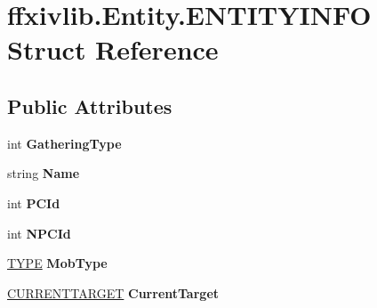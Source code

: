\hypertarget{structffxivlib_1_1_entity_1_1_e_n_t_i_t_y_i_n_f_o}{\section{ffxivlib.\-Entity.\-E\-N\-T\-I\-T\-Y\-I\-N\-F\-O Struct Reference}
\label{structffxivlib_1_1_entity_1_1_e_n_t_i_t_y_i_n_f_o}
}
\subsection*{Public Attributes}
\begin{DoxyCompactItemize}
\item 
\hypertarget{structffxivlib_1_1_entity_1_1_e_n_t_i_t_y_i_n_f_o_a179e48b58b038509c996fd001b630450}{int {\bfseries Gathering\-Type}}\label{structffxivlib_1_1_entity_1_1_e_n_t_i_t_y_i_n_f_o_a179e48b58b038509c996fd001b630450}

\item 
\hypertarget{structffxivlib_1_1_entity_1_1_e_n_t_i_t_y_i_n_f_o_a6e5d16391e1a4c5315d62bedb8adc6ee}{string {\bfseries Name}}\label{structffxivlib_1_1_entity_1_1_e_n_t_i_t_y_i_n_f_o_a6e5d16391e1a4c5315d62bedb8adc6ee}

\item 
\hypertarget{structffxivlib_1_1_entity_1_1_e_n_t_i_t_y_i_n_f_o_afa12b9fce3ef427e77dbc4959323da85}{int {\bfseries P\-C\-Id}}\label{structffxivlib_1_1_entity_1_1_e_n_t_i_t_y_i_n_f_o_afa12b9fce3ef427e77dbc4959323da85}

\item 
\hypertarget{structffxivlib_1_1_entity_1_1_e_n_t_i_t_y_i_n_f_o_ab314a76301cf72f6db84632975204195}{int {\bfseries N\-P\-C\-Id}}\label{structffxivlib_1_1_entity_1_1_e_n_t_i_t_y_i_n_f_o_ab314a76301cf72f6db84632975204195}

\item 
\hypertarget{structffxivlib_1_1_entity_1_1_e_n_t_i_t_y_i_n_f_o_a42fd66513e50082589fa96b06b8bb5ca}{\hyperlink{namespaceffxivlib_aaa4e86d1ea6dbc1661147e6616256e68}{T\-Y\-P\-E} {\bfseries Mob\-Type}}\label{structffxivlib_1_1_entity_1_1_e_n_t_i_t_y_i_n_f_o_a42fd66513e50082589fa96b06b8bb5ca}

\item 
\hypertarget{structffxivlib_1_1_entity_1_1_e_n_t_i_t_y_i_n_f_o_aabe85fc004243fb307da9691578df5b3}{\hyperlink{namespaceffxivlib_a027fd426531e3a42243f5c2b946dde31}{C\-U\-R\-R\-E\-N\-T\-T\-A\-R\-G\-E\-T} {\bfseries Current\-Target}}\label{structffxivlib_1_1_entity_1_1_e_n_t_i_t_y_i_n_f_o_aabe85fc004243fb307da9691578df5b3}


\end{DoxyCompactItemize}
